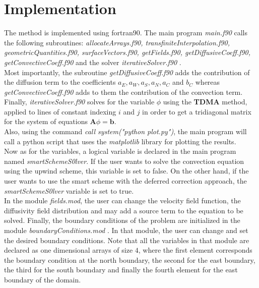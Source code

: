 \documentclass[a4paper, 11pt]{article}
\begin{document}
\section*{Implementation}
The method is implemented using fortran90. The main program \textit{main.f90} calls the following subroutines: \textit{allocateArrays.f90, transfiniteInterpolation.f90, geometricQuantities.f90, surfaceVectors.f90, getFields.f90, getDiffusiveCoeff.f90, getConvectiveCoeff.f90} and the solver \textit{iterativeSolver.f90} . \\
Most importantly, the subroutine \textit{getDiffusiveCoeff.f90} adds the contribution of the diffusion term to the coefficients $a_E, a_W, a_S, a_N, a_C$ and $b_C$ whereas \textit{getConvectiveCoeff.f90} adds to them the contribution of the convection term. Finally, \textit{iterativeSolver.f90} solves for the variable $\phi$ using the \textbf{TDMA} method, applied to lines of constant indexing $i$ and $j$ in order to get a tridiagonal matrix for the system of equations $\textbf{A}\phi=\textbf{b}$. \\ 
Also, using the command \textit{call system("python plot.py")}, the main program will call a python script that uses the \textit{matplotlib} library for plotting the results.\\
Now as for the variables, a logical variable is declared in the main program named \textit{smartSchemeS0lver}. If the user wants to solve the convection equation using the upwind scheme, this variable is set to false. On the other hand, if the user wants to use the smart scheme with the deferred correction approach, the \textit{smartSchemeS0lver} variable is set to true.\\
In the module \textit{fields.mod}, the user can change the velocity field function, the diffusivity field distribution and may add a source term to the equation to be solved. Finally, the boundary conditions of the problem are initialized in the module \textit{boundaryConditions.mod} . In that module, the user can change and set the desired boundary conditions. Note that all the variables in that module are declared as one dimensional arrays of size $4$, where the first element corresponds the boundary condition at the north boundary, the second for the east boundary, the third for the south boundary and finally the fourth element for the east boundary of the domain.
\end{document}
